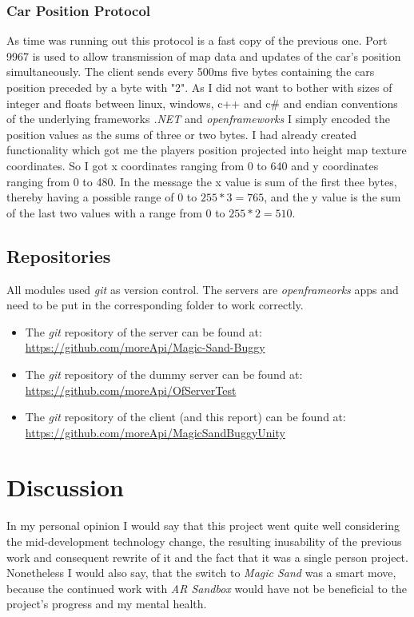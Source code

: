 \documentclass[12pt,a4paper,twoside,titlepage,headsepline,numbers=noenddot,listof=totoc,index=totoc,bibliography=totoc]{scrartcl}
\theoremstyle{break}
\begin{document}
\subsubsection{Car Position Protocol}
As time was running out this protocol is a fast copy of the previous one. Port 9967 is used to allow transmission of map data and updates of the car's position simultaneously. The client sends every 500ms five bytes containing the cars position preceded by a byte with "2". As I did not want to bother with sizes of integer and floats between linux, windows, c++ and c\# and endian conventions of the underlying frameworks \textit{.NET} and \textit{openframeworks} I simply encoded the position values as the sums of three or two bytes. I had already created functionality which got me the players position projected into height map texture coordinates. So I got x coordinates ranging from 0 to 640 and y coordinates ranging from 0 to 480. In the message the x value is sum of the first thee bytes, thereby having a possible range of 0 to $255*3=765$, and the y value is the sum of the last two values with a range from 0 to $255*2=510$.

\subsection{Repositories}
All modules used \textit{git} as version control. The servers are \textit{openframeorks} apps and need to be put in the corresponding folder to work correctly.

\begin{itemize}
	\item The \textit{git} repository of the server can be found at:\\ \url{https://github.com/moreApi/Magic-Sand-Buggy}
	\item The \textit{git} repository of the dummy server can be found at:\\ \url{https://github.com/moreApi/OfServerTest}
	\item The \textit{git} repository of the client (and this report) can be found at:\\ \url{https://github.com/moreApi/MagicSandBuggyUnity}
\end{itemize}

\section{Discussion}
In my personal opinion I would say that this project went quite well considering the mid-development technology change, the resulting inusability of the previous work and consequent rewrite of it and the fact that it was a single person project. Nonetheless I would also say, that the switch to \textit{Magic Sand} was a smart move, because the continued work with \textit{AR Sandbox} would have not be beneficial to the project's progress and my mental health. 
\end{document}
